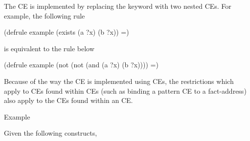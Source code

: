 \documentclass[letterpaper,10pt,english]{sphinxmanual}
\begin{document}
The  CE is implemented by replacing the  keyword
with two nested  CEs. For example, the following rule

\begin{sphinxVerbatim}[commandchars=\\\{\}]
(defrule example
  (exists (a ?x) (b ?x))
 =\PYGZgt{})
\end{sphinxVerbatim}

is equivalent to the rule below

\begin{sphinxVerbatim}[commandchars=\\\{\}]
(defrule example
  (not (not (and (a ?x) (b ?x))))
  =\PYGZgt{})
\end{sphinxVerbatim}

Because of the way the  CE is implemented using  CEs,
the restrictions which apply to CEs found within  CEs (such as
binding a pattern CE to a fact-address) also apply to the CEs found
within an  CE.

Example

Given the following constructs,

\begin{sphinxVerbatim}[commandchars=\\\{\}]
 
 
   
     
 
   
      
     
     
 
   
     
     
\end{sphinxVerbatim}
\end{document}
